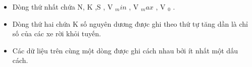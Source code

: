 \begin{itemize}
	\item     Dòng thứ nhất chứa N, K ,S , V    $_     min    $    , V    $_     max    $    , V    $_     0    $    .   
	\item     Dòng thứ hai chứa K số nguyên dương được ghi theo thứ tự tăng dần là chỉ số của các xe rời khỏi tuyến.   
	\item     Các dữ liệu trên cùng một dòng được ghi cách nhau bởi ít nhất một dấu cách.   
\end{itemize}